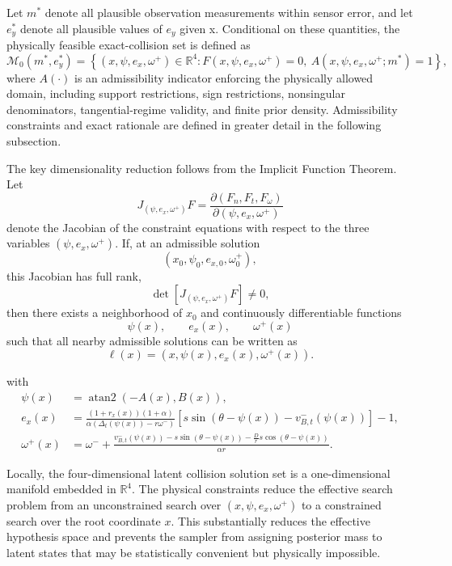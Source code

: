 \documentclass[11pt]{article}
\begin{document}
Let \(m^{\ast}\) denote all plausible observation measurements within sensor error, and let \(e_y^{\ast}\) denote all plausible values of \(e_y\) given x. Conditional on these quantities, the physically feasible exact-collision set is defined as
\[
\mathcal{M}_0(m^{\ast}, e_y^{\ast})
=
\left\{
(x,\psi,e_x,\omega^{+}) \in \mathbb{R}^4
:
F(x,\psi,e_x,\omega^{+}) = 0,
\ A(x,\psi,e_x,\omega^{+};m^{\ast}) = 1
\right\},
\]
where $A(\cdot)$ is an admissibility indicator enforcing the physically allowed
domain, including support restrictions, sign restrictions, nonsingular
denominators, tangential-regime validity, and finite prior density. Admissibility constraints and exact rationale are defined in greater detail in the following subsection.

The key dimensionality reduction follows from the Implicit Function Theorem.
Let
\[
J_{(\psi,e_x,\omega^{+})}F
=
\frac{\partial(F_n,F_t,F_{\omega})}
{\partial(\psi,e_x,\omega^{+})}
\]
denote the Jacobian of the constraint equations with respect to the three
variables $(\psi,e_x,\omega^{+})$. If, at an admissible solution
\[
(x_0,\psi_0,e_{x,0},\omega_0^{+}),
\]
this Jacobian has full rank,
\[
\det
\left[
J_{(\psi,e_x,\omega^{+})}F
\right]
\neq 0,
\]
then there exists a neighborhood of $x_0$ and continuously differentiable
functions
\[
\psi(x), \qquad e_{x}(x), \qquad \omega^{+}(x)
\]
such that all nearby admissible solutions can be written as
\[
\ell(x)
=
\left(
x,\psi(x),e_{x}(x),\omega^{+}(x)
\right).
\]

with
\begin{align}
\psi(x)
&=
\operatorname{atan2}\!\left(-A(x),B(x)\right),
\\[0.75em]
e_x(x)
&=
\frac{\left(1+r_x(x)\right)(1+\alpha)}
{\alpha\left(\Delta_t(\psi(x))-r\omega^{-}\right)}
\left[
s\sin\!\left(\theta-\psi(x)\right)
-
v^{-}_{B,t}(\psi(x))
\right]
-1,
\\[0.75em]
\omega^{+}(x)
&=
\omega^{-}
+
\frac{
v^{-}_{B,t}(\psi(x))
-
s\sin\!\left(\theta-\psi(x)\right)
-
\frac{D}{r}s\cos\!\left(\theta-\psi(x)\right)
}
{\alpha r}.
\end{align}

Locally, the four-dimensional latent collision solution set is a
one-dimensional manifold embedded in $\mathbb{R}^4$. The physical constraints
reduce the effective search problem from an unconstrained search over
$(x,\psi,e_x,\omega^{+})$ to a constrained search over the root coordinate $x$. This substantially reduces the
effective hypothesis space and prevents the sampler from assigning posterior
mass to latent states that may be statistically convenient but physically
impossible.
\end{document}
